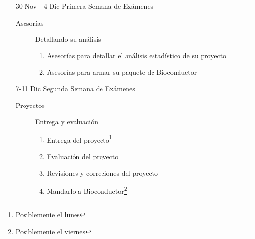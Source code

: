 \documentclass[letterpaper,12pt]{article}
\begin{document}
\begin{itemize}
  \item[30 Nov - 4 Dic] Primera Semana de Exámenes
  \begin{description}
  \item[Asesorías] Detallando su análisis
  \begin{enumerate}
  \item Asesorías para detallar el análisis estadístico de su proyecto
  \item Asesorías para armar su paquete de Bioconductor
  \end{enumerate}
  \end{description}
  
  \item[7-11 Dic] Segunda Semana de Exámenes
  \begin{description}
  \item[Proyectos] Entrega y evaluación
  \begin{enumerate}
  \item Entrega del proyecto\footnote{Posiblemente el lunes}
  \item Evaluación del proyecto
  \item Revisiones y correciones del proyecto
  \item Mandarlo a Bioconductor\footnote{Posiblemente el viernes}
  \end{enumerate}
  \end{description}

  
\end{itemize}
\end{document}
